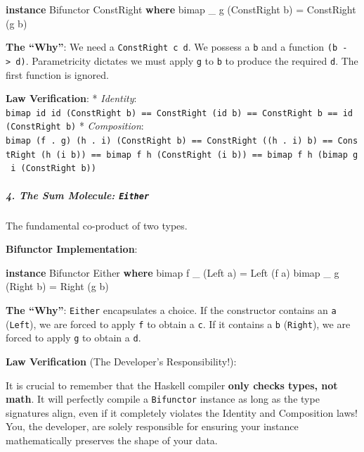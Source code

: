 \documentclass[
]{article}
\newenvironment{Shaded}{}{}
\newcommand{\DataTypeTok}[1]{\textcolor[rgb]{0.56,0.13,0.00}{#1}}
\newcommand{\KeywordTok}[1]{\textcolor[rgb]{0.00,0.44,0.13}{\textbf{#1}}}
\newcommand{\NormalTok}[1]{#1}
\newcommand{\OtherTok}[1]{\textcolor[rgb]{0.00,0.44,0.13}{#1}}
\begin{document}
\begin{Shaded}
\begin{Highlighting}[]
\KeywordTok{instance} \DataTypeTok{Bifunctor} \DataTypeTok{ConstRight} \KeywordTok{where}
\NormalTok{    bimap \_ g (}\DataTypeTok{ConstRight}\NormalTok{ b) }\OtherTok{=} \DataTypeTok{ConstRight}\NormalTok{ (g b)}
\end{Highlighting}
\end{Shaded}

\textbf{The ``Why''}: We need a \texttt{ConstRight\ c\ d}. We possess a
\texttt{b} and a function \texttt{(b\ -\textgreater{}\ d)}.
Parametricity dictates we must apply \texttt{g} to \texttt{b} to produce
the required \texttt{d}. The first function is ignored.

\textbf{Law Verification}: * \emph{Identity}:
\texttt{bimap\ id\ id\ (ConstRight\ b)\ ==\ ConstRight\ (id\ b)\ ==\ ConstRight\ b\ ==\ id\ (ConstRight\ b)}
* \emph{Composition}:
\texttt{bimap\ (f\ .\ g)\ (h\ .\ i)\ (ConstRight\ b)\ ==\ ConstRight\ ((h\ .\ i)\ b)\ ==\ ConstRight\ (h\ (i\ b))\ ==\ bimap\ f\ h\ (ConstRight\ (i\ b))\ ==\ bimap\ f\ h\ (bimap\ g\ i\ (ConstRight\ b))}

\subparagraph{\texorpdfstring{4. The Sum Molecule:
\texttt{Either}}{4. The Sum Molecule: Either}}\label{the-sum-molecule-either}

The fundamental co-product of two types.

\textbf{Bifunctor Implementation}:

\begin{Shaded}
\begin{Highlighting}[]
\KeywordTok{instance} \DataTypeTok{Bifunctor} \DataTypeTok{Either} \KeywordTok{where}
\NormalTok{    bimap f \_ (}\DataTypeTok{Left}\NormalTok{ a)  }\OtherTok{=} \DataTypeTok{Left}\NormalTok{ (f a)}
\NormalTok{    bimap \_ g (}\DataTypeTok{Right}\NormalTok{ b) }\OtherTok{=} \DataTypeTok{Right}\NormalTok{ (g b)}
\end{Highlighting}
\end{Shaded}

\textbf{The ``Why''}: \texttt{Either} encapsulates a choice. If the
constructor contains an \texttt{a} (\texttt{Left}), we are forced to
apply \texttt{f} to obtain a \texttt{c}. If it contains a \texttt{b}
(\texttt{Right}), we are forced to apply \texttt{g} to obtain a
\texttt{d}.

\textbf{Law Verification} (The Developer's Responsibility!):

It is crucial to remember that the Haskell compiler \textbf{only checks
types, not math}. It will perfectly compile a \texttt{Bifunctor}
instance as long as the type signatures align, even if it completely
violates the Identity and Composition laws! You, the developer, are
solely responsible for ensuring your instance mathematically preserves
the shape of your data.
\end{document}
